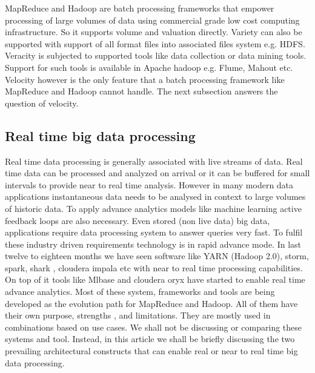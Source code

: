 MapReduce and Hadoop are batch processing frameworks that empower processing of large volumes of data using commercial grade low cost computing infrastructure. So it supports volume and valuation directly. Variety can also be supported with support of all format files into associated files system e.g. HDFS.  Veracity is subjected to supported tools like data collection or data mining tools. Support for such tools is available in Apache hadoop e.g. Flume, Mahout etc. Velocity however is the only feature that a batch processing framework like MapReduce and Hadoop cannot handle. The next subsection answers the question of velocity.

\subsection{ Real time big data processing }
Real time data processing is generally associated with live streams of data. Real time data can be processed and analyzed on arrival or it can be buffered for small intervals to provide near to real time analysis. However in many modern data applications instantaneous data needs to be analysed in context to large volumes of historic data. To apply advance analytics models like machine learning active feedback loops are also necessary.  Even stored (non live data) big data, applications require data processing system to answer queries very fast. To fulfil these industry driven requirements technology is in rapid advance mode. In last twelve to eighteen months we have seen software like YARN (Hadoop 2.0), storm, spark, shark , cloudera impala etc with near to real time processing capabilities. On top of it tools like Mlbase and cloudera oryx have started to enable real time advance analytics. Most of these system, frameworks and tools are being developed as the evolution path for MapReduce and Hadoop. All of them have their own purpose, strengths , and limitations. They are mostly used in combinations based on use cases. We shall not be discussing or comparing these systems and tool. Instead, in this article we shall be briefly discussing the two prevailing architectural constructs that can enable real or near to real time big data processing.

